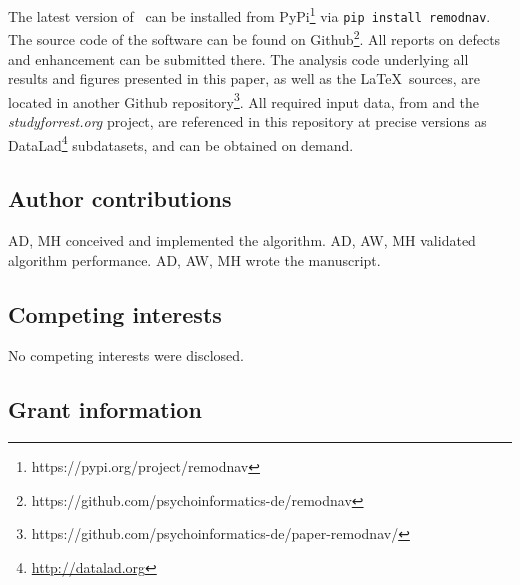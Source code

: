 The latest version of \remodnav\ can be installed from
PyPi\footnote{https://pypi.org/project/remodnav} via \texttt{pip install
remodnav}. The source code of the software can be found on
Github\footnote{https://github.com/psychoinformatics-de/remodnav}. All reports
on defects and enhancement can be submitted there.
%
The analysis code underlying all results and figures presented in this paper,
as well as the \LaTeX\ sources, are located in another Github
repository\footnote{https://github.com/psychoinformatics-de/paper-remodnav/}.
All required input data, from \cite{Andersson2017} and the
\textit{studyforrest.org} project, are referenced in this repository at precise
versions as DataLad\footnote{\url{http://datalad.org}} subdatasets, and can be
obtained on demand.

\subsection*{Author contributions}


AD, MH conceived and implemented the algorithm.
AD, AW, MH validated algorithm performance.
AD, AW, MH wrote the manuscript.

\subsection*{Competing interests}


No competing interests were disclosed.

\subsection*{Grant information}

